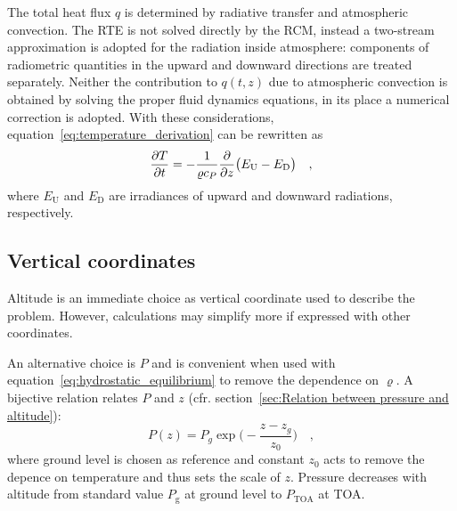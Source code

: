 \documentclass[a4paper,10pt,twocolumn,\classoptions]{article}
\newcommand{\PTOA}{P_\text{TOA}}
\begin{document}
The total heat flux $q$ is determined by radiative transfer and atmospheric convection. The RTE is not solved directly by the RCM, instead a two-stream approximation is adopted for the radiation inside atmosphere: components of radiometric quantities in the upward and downward directions are treated separately. Neither the contribution to $q(t,z)$ due to atmospheric convection is obtained by solving the proper fluid dynamics equations, in its place a numerical correction is adopted. %
With these considerations, equation~\eqref{eq:temperature_derivation} can be rewritten as
\begin{equation}
  \label{eq:temperature}
  \pdv{T}{t} = -\frac{1}{\varrho c_P} \pdv*{\big( E_\text{U} - E_\text{D} \big)}{z}
  \quad ,
\end{equation}
where $E_\text{U}$ and $E_\text{D}$ are irradiances of upward and downward radiations, respectively.



\subsection{Vertical coordinates}
\label{sec:Vertical coordinates}
Altitude is an immediate choice as vertical coordinate used to describe the problem. However, calculations may simplify more if expressed with other coordinates.

An alternative choice is $P$ and is convenient when used with equation~\eqref{eq:hydrostatic_equilibrium} to remove the dependence on $\varrho$. A bijective relation relates $P$ and $z$ (cfr. section~\ref{sec:Relation between pressure and altitude}):
\begin{equation}
  \label{eq:pressure_altitude}
  P(z) = P_g \exp{\bigg( - \frac{z - z_g}{z_0} \bigg)}
  \quad ,
\end{equation}
where ground level is chosen as reference and constant $z_0$ acts to remove the depence on temperature and thus sets the scale of $z$. Pressure decreases with altitude from standard value $P_\text{g}$ at ground level to $\PTOA$ at TOA.
\end{document}
